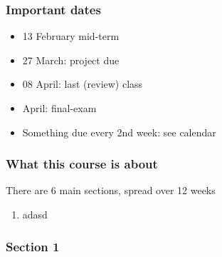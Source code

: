 \begin{frame}\frametitle{Important dates}
	\begin{itemize}
		\item	13 February mid-term  %
		\item	27 March: project due 
		\item	08 April: last (review) class
		\item	April: final-exam 
	\end{itemize}
	\begin{itemize}
		\item	Something due every 2nd week: see calendar
	\end{itemize}
\end{frame}

\begin{frame}\frametitle{What this course is about}
		There are 6 main sections, spread over 12 weeks
	\begin{enumerate}
		\item	adasd
	\end{enumerate}
\end{frame}

\begin{frame}\frametitle{Section 1}

\end{frame}


